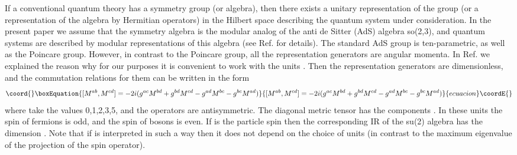 \documentclass[a4paper,12pt]{article}%
\begin{document}
If a conventional quantum theory has a symmetry group (or
algebra), then there exists a unitary representation of 
the group (or a representation of the algebra by Hermitian
operators) in the Hilbert space describing the quantum 
system under consideration. In the present paper we assume
that the symmetry algebra is the modular analog of the 
anti de Sitter (AdS) algebra so(2,3), and quantum systems are
described by modular representations of this algebra (see
Ref. \cite{lev2} for details). The standard AdS group
is ten-parametric, as well as the Poincare group. However, 
in contrast to the Poincare group, all the representation 
generators are angular momenta. In Ref. \cite{lev2} we 
explained the reason why for our
purposes it is convenient to work with the units 
\coordHE{}. Then the representation generators are
dimensionless, and the commutation relations for them can be 
written in the form
\begin{equation}\coord{}\boxEquation{
[M^{ab},M^{cd}]=-2i (g^{ac}M^{bd}+g^{bd}M^{cd}-
g^{ad}M^{bc}-g^{bc}M^{ad})
\label{1}
}{
[M^{ab},M^{cd}]=-2i (g^{ac}M^{bd}+g^{bd}M^{cd}-
g^{ad}M^{bc}-g^{bc}M^{ad})
}{ecuacion}\coordE{}\end{equation}
where \coordHE{} take the values 0,1,2,3,5, and the operators 
\coordHE{} are antisymmetric. The diagonal metric tensor has the 
components \coordHE{}.  
In these units the spin of fermions is odd, and the spin of 
bosons is even. If \coordHE{} is the particle spin then the 
corresponding IR of the su(2) algebra has the dimension
\coordHE{}. Note that if \coordHE{} is interpreted in such a way then it
does not depend on the choice of units (in contrast to the
maximum eigenvalue of the \coordHE{} projection of the spin
operator).    
\end{document}
